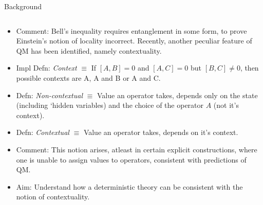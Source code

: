 \documentclass[final,hyperref={pdfpagelabels=false}]{beamer}
\begin{document}
\begin{frame}[t]
\begin{columns}[c]
\begin{column}{.32\textwidth}
\begin{block}{Background}
\begin{columns}
\begin{column}{0.7\textwidth}
\begin{itemize}
            \item Comment: Bell's inequality requires entanglement in some form, to prove Einstein's notion of locality incorrect. Recently, another peculiar feature of QM has been identified, namely contextuality. 

            \item Impl Defn: \emph{Context} $\equiv$ If $[A,B]=0$ and $[A,C]=0$ but $[B,C]\neq 0$, then possible contexts are {A}, {A and B} or {A and C}.

            \item Defn: \emph{Non-contextual} $\equiv$ Value an operator takes, depends only on the state (including `hidden variables) and the choice of the operator $A$ (not it's context).

            \item Defn: \emph{Contextual} $\equiv$ Value an operator takes, depends on it's context.

            \item Comment: This notion arises, atleast in certain explicit constructions, where one is unable to assign values to operators, consistent with predictions of QM.

            \item Aim: Understand how a deterministic theory can be consistent with the notion of contextuality.
            \end{itemize}
          \end{column}


\end{columns}
\end{block}
\end{column}
\end{columns}
\end{frame}
\end{document}
